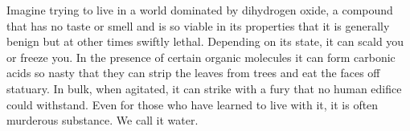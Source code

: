 Imagine trying to live in a world dominated by dihydrogen oxide, a
compound that has no taste or smell and is so viable in its properties
that it is generally benign but at other times swiftly lethal.
Depending on its state, it can scald you or freeze you. In the
presence of certain organic molecules it can form carbonic acids so
nasty that they can strip the leaves from trees and eat the faces off
statuary.  In bulk, when agitated, it can strike with a fury that no
human edifice could withstand. Even for those who have learned to live
with it, it is often murderous substance. We call it water.